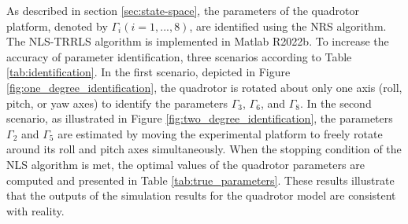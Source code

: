 \documentclass[3p,times]{elsarticle}
\begin{document}
\noindent As described in section \ref{sec:state-space}, the parameters of the quadrotor platform, denoted by $\Gamma_i (i=1, ..., 8)$, are identified using the NRS algorithm. The NLS-TRRLS algorithm is implemented in Matlab R2022b\textregistered. To increase the accuracy of parameter identification, three scenarios according to Table \ref{tab:identification}.
In the first scenario, depicted in Figure \ref{fig:one_degree_identification}, the quadrotor is rotated about only one axis (roll, pitch, or yaw axes) to identify the parameters $\Gamma_3$, $\Gamma_6$, and $\Gamma_8$. In the second scenario, as illustrated in Figure \ref{fig:two_degree_identification}, the parameters $\Gamma_2$ and $\Gamma_5$ are estimated by moving the experimental platform to freely rotate around its roll and pitch axes simultaneously. When the stopping condition of the NLS algorithm is met, the optimal values of the quadrotor parameters are computed and presented in Table \ref{tab:true_parameters}. These results illustrate that the outputs of the simulation results for the quadrotor model are consistent with reality.
\end{document}
